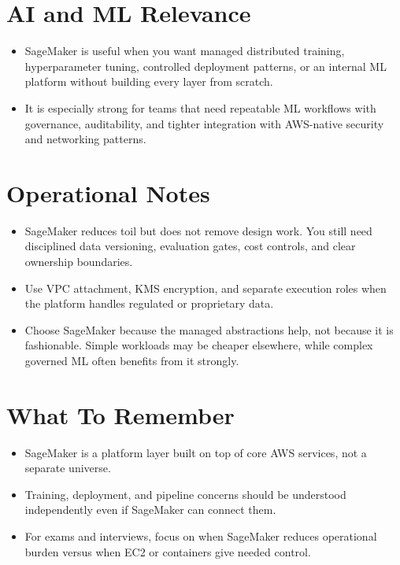 \documentclass[10pt,twocolumn]{article}
\begin{document}
\section*{AI and ML Relevance}
\begin{itemize}
\item SageMaker is useful when you want managed distributed training, hyperparameter tuning, controlled deployment patterns, or an internal ML platform without building every layer from scratch.
\item It is especially strong for teams that need repeatable ML workflows with governance, auditability, and tighter integration with AWS-native security and networking patterns.
\end{itemize}

\section*{Operational Notes}
\begin{itemize}
\item SageMaker reduces toil but does not remove design work. You still need disciplined data versioning, evaluation gates, cost controls, and clear ownership boundaries.
\item Use VPC attachment, KMS encryption, and separate execution roles when the platform handles regulated or proprietary data.
\item Choose SageMaker because the managed abstractions help, not because it is fashionable. Simple workloads may be cheaper elsewhere, while complex governed ML often benefits from it strongly.
\end{itemize}

\section*{What To Remember}
\begin{itemize}
\item SageMaker is a platform layer built on top of core AWS services, not a separate universe.
\item Training, deployment, and pipeline concerns should be understood independently even if SageMaker can connect them.
\item For exams and interviews, focus on when SageMaker reduces operational burden versus when EC2 or containers give needed control.
\end{itemize}
\end{document}
